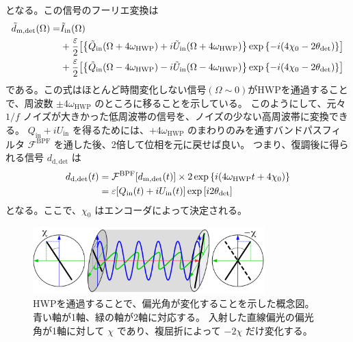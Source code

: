 \documentclass[../../main.tex]{subfiles}
\begin{document}
となる。この信号のフーリエ変換は
\begin{equation}
    \begin{split}
        \tilde{d}_{\mathrm{m}, \mathrm{det}}(\Omega) = &\tilde{I}_{\mathrm{in}}(\Omega) \\
            &+ \dfrac{\varepsilon}{2}\qty[\qty{\tilde{Q}_{\mathrm{in}}(\Omega+4\omega_{\mathrm{HWP}})+i\tilde{U}_{\mathrm{in}}(\Omega+4\omega_{\mathrm{HWP}})}\exp\qty{-i\qty(4\chi_0 - 2\theta_{\mathrm{det}})}] \\
            &+ \dfrac{\varepsilon}{2}\qty[\qty{\tilde{Q}_{\mathrm{in}}(\Omega-4\omega_{\mathrm{HWP}})-i\tilde{U}_{\mathrm{in}}(\Omega-4\omega_{\mathrm{HWP}})}\exp\qty{-i\qty(4\chi_0 - 2\theta_{\mathrm{det}})}]
    \end{split}
\end{equation}
である。この式はほとんど時間変化しない信号$(\Omega\sim0)$がHWPを通過することで、周波数 $\pm 4\omega_{\mathrm{HWP}}$ のところに移ることを示している。
このようにして、元々 $1/f$ ノイズが大きかった低周波帯の信号を、ノイズの少ない高周波帯に変換できる。
$Q_{\mathrm{in}}+iU_{\mathrm{in}}$ を得るためには、$+4\omega_{\mathrm{HWP}}$ のまわりのみを通すバンドパスフィルタ $\mathcal{F}^{\mathrm{BPF}}$ を通した後、2倍して位相を元に戻せば良い。
つまり、復調後に得られる信号 $d_{\mathrm{d, det}}$ は
\begin{align}
    d_{\mathrm{d, det}}(t) &= \mathcal{F}^{\mathrm{BPF}}\qty[d_{\mathrm{m,det}}(t)]\times 2\exp\qty{i\qty(4\omega_{\mathrm{HWP}}t + 4\chi_0)} \\
    &= \varepsilon\qty[Q_{\mathrm{in}}(t) + iU_{\mathrm{in}}(t)]\exp\qty[i2\theta_{\mathrm{det}}]
\end{align}
となる。ここで、$\chi_0$ はエンコーダによって決定される。

\begin{figure}[H]
    \centering
    \includegraphics[width=0.8\textwidth]{simons_observatory/hwp_satoru.pdf}
    \caption{HWPを通過することで、偏光角が変化することを示した概念図。青い軸が1軸、緑の軸が2軸に対応する。
    入射した直線偏光の偏光角が1軸に対して $\chi$ であり、複屈折によって $-2\chi$ だけ変化する。}
    \label{fig:so-hwp_satoru}
\end{figure}
\end{document}

